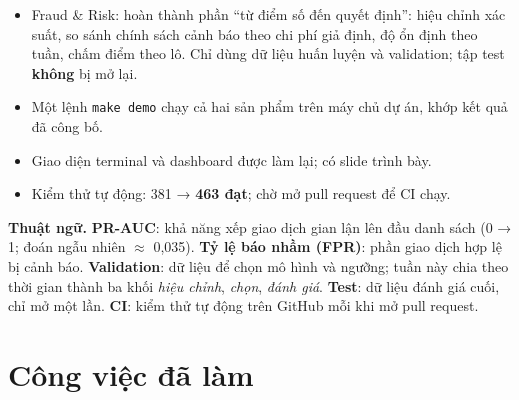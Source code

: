 \documentclass[11pt,a4paper]{article}
\begin{document}
\begin{keypoint}
\begin{itemize}
  \item Fraud \& Risk: hoàn thành phần “từ điểm số đến quyết định”: hiệu chỉnh xác suất, so sánh chính
        sách cảnh báo theo chi phí giả định, độ ổn định theo tuần, chấm điểm theo lô. Chỉ dùng dữ liệu
        huấn luyện và validation; tập test \textbf{không} bị mở lại.
  \item Một lệnh \texttt{make demo} chạy cả hai sản phẩm trên máy chủ dự án, khớp kết quả đã công bố.
  \item Giao diện terminal và dashboard được làm lại; có slide trình bày.
  \item Kiểm thử tự động: 381 → \textbf{463 đạt}; chờ mở pull request để CI chạy.
\end{itemize}
\end{keypoint}

\begin{small}
\textbf{Thuật ngữ.} \textbf{PR-AUC}: khả năng xếp giao dịch gian lận lên đầu danh sách (0 → 1; đoán
ngẫu nhiên $\approx$ 0,035). \textbf{Tỷ lệ báo nhầm (FPR)}: phần giao dịch hợp lệ bị cảnh báo.
\textbf{Validation}: dữ liệu để chọn mô hình và ngưỡng; tuần này chia theo thời gian thành ba khối
\emph{hiệu chỉnh}, \emph{chọn}, \emph{đánh giá}. \textbf{Test}: dữ liệu đánh giá cuối, chỉ mở một lần.
\textbf{CI}: kiểm thử tự động trên GitHub mỗi khi mở pull request.
\end{small}

\section{Công việc đã làm}
\end{document}
